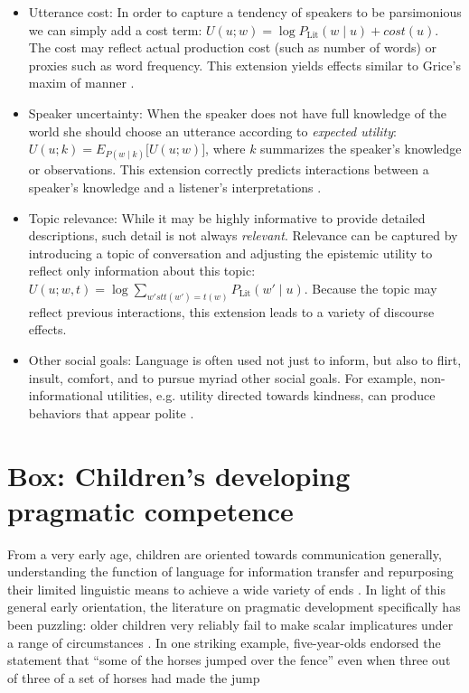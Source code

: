 \documentclass[]{elsarticle}
\begin{document}
\begin{itemize}
\item Utterance cost: In order to capture a tendency of speakers to be
  parsimonious we can simply add a cost term: $U(u; w) =
  \log P_{\text{Lit}}(w\mid u) + cost(u)$. The cost may
  reflect actual production cost (such as number of words) or proxies
  such as word frequency. This extension yields effects similar to
  Grice's maxim of manner \citep{bergen2016}.

\item Speaker uncertainty: When the speaker does not have full knowledge of
  the world she should choose an utterance according to \emph{expected
  utility}: $U(u;k) = E_{P(w\mid k)}{[}U(u;w){]}$, where $k$
  summarizes the speaker's knowledge or observations. This extension
  correctly predicts interactions between a speaker's knowledge and a
  listener's interpretations \cite{goodman2013}.

\item Topic relevance: While it may be highly informative to provide detailed descriptions, such detail is not always \emph{relevant}. Relevance can be captured by introducing a topic of conversation \citep[sometimes known as a \emph{Question Under Discussion}][]{roberts1996} and adjusting the epistemic utility to reflect only information about this topic: $U(u;w,t)=\log \sum_{w' st t(w')=t(w)} P_{\text{Lit}}(w'\mid u)$. Because the topic may reflect previous interactions, this extension leads to a variety of discourse effects.

\item Other social goals: Language is often used not just to inform, but
  also to flirt, insult, comfort, and to pursue myriad other social
  goals. For example, non-informational utilities, e.g. utility directed towards
  kindness, can produce behaviors that appear polite \citep{yoon2016}.

\end{itemize}

\section{Box: Children's developing pragmatic competence}\label{box-childrens-developing-pragmatic-competence.}

From a very early age, children are oriented towards communication
generally, understanding the function of language for information
transfer and repurposing their limited linguistic means to achieve a
wide variety of ends \citep{vouloumanos2012,clark2010}. In light
of this general early orientation, the literature on pragmatic
development specifically has been puzzling: older children very reliably
fail to make scalar implicatures under a range of circumstances \citep{noveck2001}. In one striking example, five-year-olds endorsed the statement that ``some of the horses jumped over the fence'' even when three out of three of a set of horses had made the jump \citep{papafragou2003}
\end{document}
